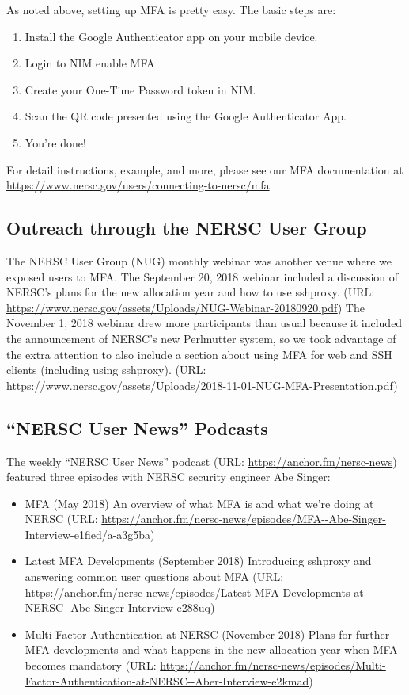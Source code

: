 \documentclass[sigconf,review]{acmart}
\begin{document}
As noted above, setting up MFA is pretty easy.  The basic steps are:

\begin{enumerate}
\item Install the Google Authenticator app on your mobile device.
\item Login to NIM enable MFA
\item Create your One-Time Password token in NIM.
\item Scan the QR code presented using the Google Authenticator App.
\item You're done!
\end{enumerate}

For detail instructions, example, and more, please see our MFA documentation at
\url{https://www.nersc.gov/users/connecting-to-nersc/mfa}

\subsection{Outreach through the NERSC User Group}
\label{nug}

The NERSC User Group (NUG) monthly webinar was another venue where we exposed
users to MFA. The September 20, 2018 webinar included a discussion of NERSC's
plans for the new allocation year and how to use sshproxy. (URL: \url{https://www.nersc.gov/assets/Uploads/NUG-Webinar-20180920.pdf})
The November 1, 2018 webinar drew more participants than usual because it
included the announcement of NERSC's new Perlmutter system, so we took
advantage of the extra attention to also include a section about using MFA for
web and SSH clients (including using sshproxy). (URL: \url{https://www.nersc.gov/assets/Uploads/2018-11-01-NUG-MFA-Presentation.pdf})

\subsection{``NERSC User News'' Podcasts}
\label{podcast}

The weekly ``NERSC User News'' podcast 
(URL: \url{https://anchor.fm/nersc-news}) featured three episodes with NERSC
security engineer Abe Singer:
\begin{itemize}
\item  MFA (May 2018) An overview of what MFA is and what we're doing at NERSC (URL: \url{https://anchor.fm/nersc-news/episodes/MFA--Abe-Singer-Interview-e1fied/a-a3g5ba})
\item  Latest MFA Developments (September 2018) Introducing sshproxy and answering common user questions about MFA (URL: \url{https://anchor.fm/nersc-news/episodes/Latest-MFA-Developments-at-NERSC--Abe-Singer-Interview-e288uq})
\item  Multi-Factor Authentication at NERSC (November 2018) Plans for further MFA developments and what happens in the new allocation year when MFA becomes mandatory (URL: \url{https://anchor.fm/nersc-news/episodes/Multi-Factor-Authentication-at-NERSC--Aber-Interview-e2kmad})
\end{itemize}
\end{document}
